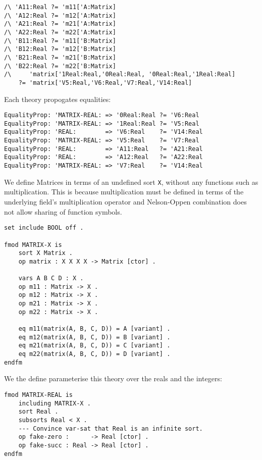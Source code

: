 \documentclass[]{article}
\begin{document}
\begin{verbatim}
/\ 'A11:Real ?= 'm11['A:Matrix] 
/\ 'A12:Real ?= 'm12['A:Matrix] 
/\ 'A21:Real ?= 'm21['A:Matrix] 
/\ 'A22:Real ?= 'm22['A:Matrix] 
/\ 'B11:Real ?= 'm11['B:Matrix] 
/\ 'B12:Real ?= 'm12['B:Matrix] 
/\ 'B21:Real ?= 'm21['B:Matrix] 
/\ 'B22:Real ?= 'm22['B:Matrix] 
/\     'matrix['1Real:Real,'0Real:Real, '0Real:Real,'1Real:Real]
    ?= 'matrix['V5:Real,'V6:Real,'V7:Real,'V14:Real]
\end{verbatim}

Each theory propogates equalities:

\begin{verbatim}
EqualityProp: 'MATRIX-REAL: => '0Real:Real ?= 'V6:Real
EqualityProp: 'MATRIX-REAL: => '1Real:Real ?= 'V5:Real
EqualityProp: 'REAL:        => 'V6:Real    ?= 'V14:Real
EqualityProp: 'MATRIX-REAL: => 'V5:Real    ?= 'V7:Real
EqualityProp: 'REAL:        => 'A11:Real   ?= 'A21:Real
EqualityProp: 'REAL:        => 'A12:Real   ?= 'A22:Real
EqualityProp: 'MATRIX-REAL: => 'V7:Real    ?= 'V14:Real
\end{verbatim}

We define Matrices in terms of an undefined sort \texttt{X}, without any
functions such as multiplication. This is because multiplication must be
defined in terms of the underlying field's multiplication operator and
Nelson-Oppen combination does not allow sharing of function symbols.

\begin{verbatim}
set include BOOL off .

fmod MATRIX-X is
    sort X Matrix .
    op matrix : X X X X -> Matrix [ctor] .

    vars A B C D : X .
    op m11 : Matrix -> X .
    op m12 : Matrix -> X .
    op m21 : Matrix -> X .
    op m22 : Matrix -> X .

    eq m11(matrix(A, B, C, D)) = A [variant] .
    eq m12(matrix(A, B, C, D)) = B [variant] .
    eq m21(matrix(A, B, C, D)) = C [variant] .
    eq m22(matrix(A, B, C, D)) = D [variant] .
endfm
\end{verbatim}

We the define parameterise this theory over the reals and the integers:

\begin{verbatim}
fmod MATRIX-REAL is
    including MATRIX-X .
    sort Real .
    subsorts Real < X .
    --- Convince var-sat that Real is an infinite sort.
    op fake-zero :      -> Real [ctor] .
    op fake-succ : Real -> Real [ctor] .
endfm
\end{verbatim}
\end{document}

